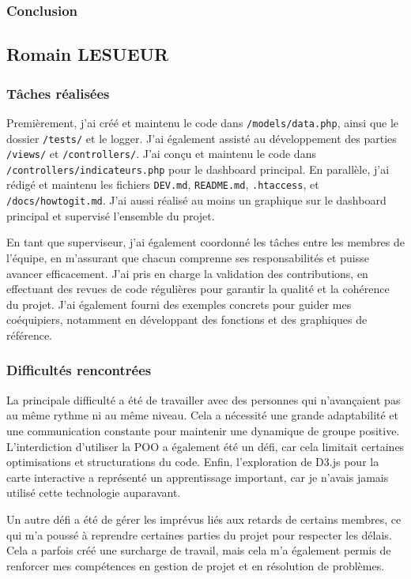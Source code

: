 \documentclass[11pt]{article}
\begin{document}
\subsubsection*{Conclusion}

\newpage
\subsection*{Romain LESUEUR}
\subsubsection*{Tâches réalisées}
Premièrement, j’ai créé et maintenu le code dans \texttt{/models/data.php}, ainsi que le dossier \texttt{/tests/} et le logger. J’ai également assisté au développement des parties \texttt{/views/} et \texttt{/controllers/}. J’ai conçu et maintenu le code dans \texttt{/controllers/indicateurs.php} pour le dashboard principal. En parallèle, j’ai rédigé et maintenu les fichiers \texttt{DEV.md}, \texttt{README.md}, \texttt{.htaccess}, et \texttt{/docs/howtogit.md}. J’ai aussi réalisé au moins un graphique sur le dashboard principal et supervisé l’ensemble du projet.

En tant que superviseur, j’ai également coordonné les tâches entre les membres de l’équipe, en m’assurant que chacun comprenne ses responsabilités et puisse avancer efficacement. J’ai pris en charge la validation des contributions, en effectuant des revues de code régulières pour garantir la qualité et la cohérence du projet. J’ai également fourni des exemples concrets pour guider mes coéquipiers, notamment en développant des fonctions et des graphiques de référence.

\subsubsection*{Difficultés rencontrées}
La principale difficulté a été de travailler avec des personnes qui n’avançaient pas au même rythme ni au même niveau. Cela a nécessité une grande adaptabilité et une communication constante pour maintenir une dynamique de groupe positive. L’interdiction d’utiliser la POO a également été un défi, car cela limitait certaines optimisations et structurations du code. Enfin, l’exploration de D3.js pour la carte interactive a représenté un apprentissage important, car je n’avais jamais utilisé cette technologie auparavant.

Un autre défi a été de gérer les imprévus liés aux retards de certains membres, ce qui m’a poussé à reprendre certaines parties du projet pour respecter les délais. Cela a parfois créé une surcharge de travail, mais cela m’a également permis de renforcer mes compétences en gestion de projet et en résolution de problèmes.
\end{document}
